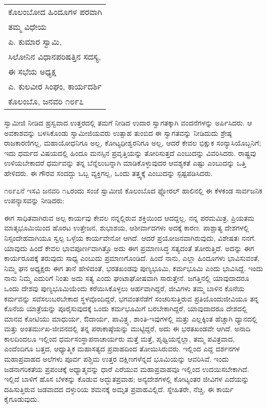 \vskip   4pt

\begin{longtable}[r]{@{}l@{}}
ಕೊಲಂಬೋದ ಹಿಂದೂಗಳ ಪರವಾಗಿ \\
ತಮ್ಮ ವಿಧೇಯ \\
ಪಿ. ಕುಮಾರ ಸ್ವಾಮಿ, \\
ಸಿಲೋನಿನ ವಿಧಾನಪರಿಷತ್ತಿನ ಸದಸ್ಯ, \\
ಈ ಸಭೆಯ ಅಧ್ಯಕ್ಷ \\
ಎ. ಕುಲವೀರ ಸಿಂಘಂ, ಕಾರ್ಯದರ್ಶಿ \\
ಕೊಲಂಬೊ, ಜನವರಿ ೧೮೯೭ \\
\end{longtable}

\vskip   4pt

ಸ್ವಾಮೀಜಿ ನೀಡಿದ ಹ್ರಸ್ವವಾದ ಉತ್ತರದಲ್ಲಿ ತಮಗೆ ನೀಡಿದ ಉದಾರ ಸ್ವಾಗತಕ್ಕಾಗಿ ವಂದನೆಗಳನ್ನು ಅರ್ಪಿಸಿದರು. ಆ ಅವಕಾಶವನ್ನು ಬಳಸಿಕೊಂಡು ಸ್ವಾಮೀಜಿಯವರು ಉತ್ಸಾಹ ತುಂಬಿದ ಈ ಸ್ವಾಗತವನ್ನು ನೀಡಿದುದು ಶ್ರೇಷ್ಠ ರಾಜಕಾರಣಿಗಲ್ಲ, ಮಹಾಯೋಧನಿಗೂ ಅಲ್ಲ, ಕೋಟ್ಯಧೀಶ್ವರನಿಗೂ ಅಲ್ಲ, ಆದರೆ ಕೇವಲ ಭಿಕ್ಷುಕ ಸಂನ್ಯಾಸಿಯೊಬ್ಬನಿಗೆ; ಇದು ಧರ್ಮದ ವಿಷಯದಲ್ಲಿ ಹಿಂದೂ ಮನಸ್ಸಿನ ಪ್ರವೃತ್ತಿಯನ್ನು ತೋರಿಸುತ್ತದೆ ಎಂಬುದನ್ನು ವಿವರಿಸಿದರು. ರಾಷ್ಟ್ರವು ಉಳಿಯಬೇಕಾದರೆ ಧರ್ಮವನ್ನು ತನ್ನ ಬೆನ್ನೆಲುಬನ್ನಾಗಿ ಮಾಡಿಕೊಳ್ಳುವುದರ ಆವಶ್ಯಕತೆ ಎಷ್ಟು ಎಂಬುದನ್ನು ಒತ್ತಿ ಹೇಳಿದರು. ಈ ಗೌರವ ಸಂದದ್ದು ಒಬ್ಬ ವ್ಯಕ್ತಿಗಲ್ಲ, ಒಂದು ತತ್ತ್ವಕ್ಕೆ ಎಂಬುದನ್ನು ಸ್ಪಷ್ಟಪಡಿಸಿದರು.

\vskip   4pt

೧೮೯೭ನೆ ಇಸವಿ ಜನವರಿ ೧೬ರಂದು ಸಂಜೆ ಸ್ವಾಮೀಜಿ ಕೊಲಂಬೊದ ಫ್ಲೋರಲ್​ ಹಾಲಿನಲ್ಲಿ ಈ ಕೆಳಕಂಡ ಸಾರ್ವಜನಿಕ ಉಪನ್ಯಾಸವನ್ನು ನೀಡಿದರು:

\newpage

ಈಗ ಸಾಧಿತವಾಗಿರುವ ಅಲ್ಪ ಕಾರ್ಯವು ಕೇವಲ ನನ್ನಲ್ಲಿರುವ ಶಕ್ತಿಯಿಂದ ಆದದ್ದಲ್ಲ. ನನ್ನ ಪರಮಮಿತ್ರ, ಪ್ರಿಯತಮ ಮಾತೃಭೂಮಿಯಿಂದ ಹೊರಟ ಉತ್ತೇಜನ, ಶುಭಾಶಯ, ಆಶೀರ್ವಾದಗಳು ಅದಕ್ಕೆ ಕಾರಣ. ಪಾಶ್ಚಾತ್ಯ ದೇಶಗಳಲ್ಲಿ ನಿಸ್ಸಂದೇಹವಾಗಿಯೂ ಸ್ವಲ್ಪ ಒಳ್ಳೆಯ ಕಾರ್ಯವೇನೋ ಆಗಿದೆ. ಆದರೆ ಪ್ರಯೋಜನವಾಗಿರುವುದು, ವಿಶೇಷತಃ ನನಗೆ. ಯಾವುದು ಹಿಂದೆ ಕೇವಲ ಭಾವಪೂರ್ಣವಾಗಿತ್ತೊ ಅದು ಈಗ ಪ್ರಮಾಣಸಿದ್ಧ ಸತ್ಯದಂತೆ ತೋರುತ್ತಿದೆ. ಅದನ್ನು ಈಗ ಕಾರ್ಯರೂಪಕ್ಕೆ ತರುವುದು ಸಾಧ್ಯ ಎಂಬುದು ಪ್ರಮಾಣಗೊಂಡಿದೆ. ಹಿಂದೆ ನಾನು, ಎಲ್ಲಾ ಹಿಂದೂಗಳು ಭಾವಿಸುವಂತೆ, ನಿಮ್ಮ ಘನ ಅಧ್ಯಕ್ಷರು ಈಗ ತಾನೆ ಹೇಳಿದಂತೆ, ಭರತಖಂಡವು ಪುಣ್ಯಭೂಮಿ, ಕರ್ಮಭೂಮಿ ಎಂದು ಭಾವಿಸಿದ್ದೆ. ಇಂದು ನಾನು ನಿಮ್ಮ ಎದುರಿಗೆ ನಿಂತು ಅದು ಸತ್ಯ ಎಂದು ಘಂಟಾಘೋಷವಾಗಿ ಸಾರುತ್ತೇನೆ. ಜಗತ್ತಿನಲ್ಲಿ ಯಾವುದಾದರೂ ಒಂದು ದೇಶವು ಪುಣ್ಯಭೂಮಿಯೆಂದು ಕರೆಯಿಸಿಕೊಳ್ಳಲು ಅರ್ಹವಾಗಿದ್ದರೆ, ಜೀವಿಗಳು ತಮ್ಮ ಬಾಳಿನ ಕೊನೆಯ ಕರ್ಮವನ್ನು ಸವೆಸಲು\break ಬರಬೇಕಾದ ಸ್ಥಳವೊಂದಿದ್ದರೆ, ಭಗವಂತನೆಡೆಗೆ ಸಂಚರಿಸುತ್ತಿರುವ ಪ್ರತಿಯೊಂದು\break ಜೀವಿಯೂ ತನ್ನ ಕೊನೆಯ ಯಾತ್ರೆಯನ್ನು ಪೂರೈಸುವುದಕ್ಕೆ ಒಂದು ಕರ್ಮಭೂಮಿಗೆ ಬರಬೇಕಾಗಿದ್ದರೆ, ಯಾವುದಾದರೂ ದೇಶದಲ್ಲಿ ಮಾನವ ಕೋಟಿಯು ಮಾಧುರ್ಯ, ಔದಾರ್ಯ, ಪಾವಿತ್ರ್ಯ, ಶಾಂತಿ-ಇವುಗಳಲ್ಲಿ ಮತ್ತು ಎಲ್ಲಕ್ಕಿಂತ ಹೆಚ್ಚಾಗಿ ಧ್ಯಾನದಲ್ಲಿ ಮತ್ತು ಅಂತರ್ಮುಖ-ಜೀವನದಲ್ಲಿ ತನ್ನ ಪರಾಕಾಷ್ಠೆಯನ್ನು ಮುಟ್ಟಿದ್ದರೆ, ಅದು ಈ ಭರತಖಂಡವೇ ಆಗಿದೆ. ಅನಾದಿ ಕಾಲದಿಂದಲೂ ಇಲ್ಲಿಂದ ಧರ್ಮಸಂಸ್ಥಾಪನಾಚಾರ್ಯರು ಮತ್ತೆ ಮತ್ತೆ, ಪೃಥ್ವಿಯನ್ನೆಲ್ಲಾ, ತಮ್ಮ ಪವಿತ್ರವಾದ, ಎಂದೆಂದಿಗೂ ಬತ್ತದ, ಆಧ್ಯಾತ್ಮಿಕ ಮಹಾಸತ್ಯದ ಪ್ರವಾಹದಿಂದ ತೋಯಿಸಿರುವರು. ಇಲ್ಲಿಂದ ಎದ್ದ ದರ್ಶನಗಳ ಮಹಾಪ್ರವಾಹದ ಅಲೆಗಳು ಪೂರ್ವ ಪಶ್ಚಿಮ ಉತ್ತರ ದಕ್ಷಿಣಗಳೆನ್ನದೆ ಭೂಮಿಯನ್ನು ಆವರಿಸಿವೆ. ಇಂದು ಜಡನಾಗರಿಕತೆಯ ಪ್ರಪಂಚಕ್ಕೆ ಅಧ್ಯಾತ್ಮವನ್ನು ಧಾರೆ ಎರೆಯುವ ಮಹಾಪ್ರವಾಹವೂ ಇಲ್ಲಿಂದ ಉದಯಿಸಬೇಕಾಗಿದೆ. ಇಲ್ಲಿದೆ ಬಾಳಿಗೆ ಹೊಸ ಬೆಳಕನ್ನು ಕೊಡುವ ಅದ್ಭುತಪ್ರವಾಹ; ಅನ್ಯದೇಶಗಳಲ್ಲಿ ಕೋಟ್ಯಂತರ ಜೀವಿಗಳ ಎದೆಯನ್ನು ದಹಿಸುತ್ತಿರುವ ಜಡವಾದದ ದಳ್ಳುರಿಯ ಶಮನಕ್ಕೆ ಅಮೃತ ಪ್ರವಾಹವಿಲ್ಲಿದೆ. ಸ್ನೇಹಿತರೇ, ನೆಚ್ಚಿ, ಈ ಕಾರ್ಯ ಕೈಗೂಡುವುದು.

